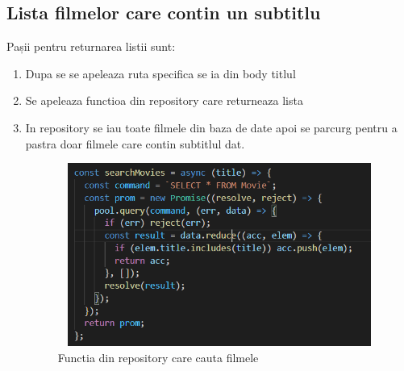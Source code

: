 \subsection{Lista filmelor care contin un subtitlu}
\par Pașii pentru returnarea listii sunt:
\begin{enumerate}
  	\item Dupa se se apeleaza ruta specifica se ia din body titlul
  	\item Se apeleaza functioa din repository care returneaza lista
  	\item In repository se iau toate filmele din baza de date apoi se parcurg pentru a pastra doar filmele care contin subtitlul dat.
		\begin{figure}[htbp]
			\centerline{\includegraphics[width=19cm, height=6cm]{figures/cautarea filme.png}}
			\caption{Functia din repository care cauta filmele}
			\label{fig}
		\end{figure}	
			
\end{enumerate}

